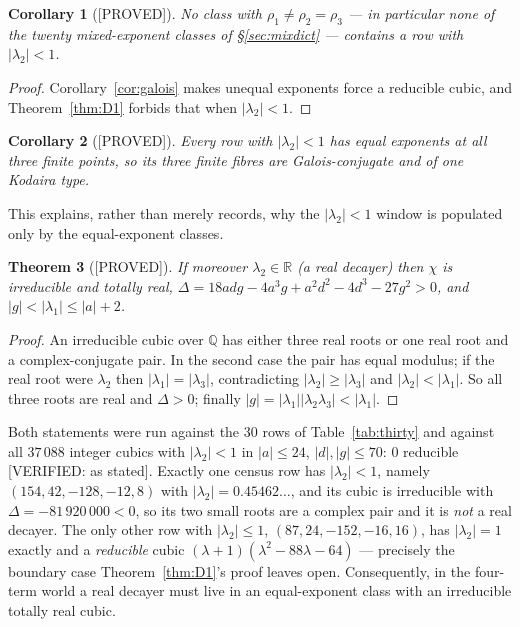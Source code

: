 \documentclass[11pt,reqno]{amsart}
\theoremstyle{plain}
\newtheorem{theorem}{Theorem}[section]
\newtheorem{corollary}[theorem]{Corollary}
\theoremstyle{definition}
\theoremstyle{remark}
\theoremstyle{plain}
\newcommand{\Q}{\mathbb{Q}}
\newcommand{\R}{\mathbb{R}}
\newcommand{\Proved}{\textup{\textsf{[PROVED]}}}
\newcommand{\Verified}[1]{\textup{\textsf{[VERIFIED: #1]}}}
\begin{document}
\begin{corollary}[\Proved]\label{cor:D11}
No class with $\rho_1\ne\rho_2=\rho_3$ --- in particular none of the twenty
mixed-exponent classes of \S\ref{sec:mixdict} --- contains a row with
$|\lambda_2|<1$.
\end{corollary}

\begin{proof}
Corollary~\ref{cor:galois} makes unequal exponents force a reducible cubic, and
Theorem~\ref{thm:D1} forbids that when $|\lambda_2|<1$.
\end{proof}

\begin{corollary}[\Proved]\label{cor:D12}
Every row with $|\lambda_2|<1$ has equal exponents at all three finite points, so
its three finite fibres are Galois-conjugate and of one Kodaira type.
\end{corollary}

This explains, rather than merely records, why the $|\lambda_2|<1$ window is
populated only by the equal-exponent classes.

\begin{theorem}[\Proved]\label{thm:D2}
If moreover $\lambda_2\in\R$ \textup{(}a \emph{real decayer}\textup{)} then
$\chi$ is irreducible and \emph{totally real},
$\Delta=18adg-4a^3g+a^2d^2-4d^3-27g^2>0$, and $|g|<|\lambda_1|\le|a|+2$.
\end{theorem}

\begin{proof}
An irreducible cubic over $\Q$ has either three real roots or one real root and a
complex-conjugate pair. In the second case the pair has equal modulus; if the
real root were $\lambda_2$ then $|\lambda_1|=|\lambda_3|$, contradicting
$|\lambda_2|\ge|\lambda_3|$ and $|\lambda_2|<|\lambda_1|$. So all three roots are
real and $\Delta>0$; finally $|g|=|\lambda_1||\lambda_2\lambda_3|<|\lambda_1|$.
\end{proof}

Both statements were run against the $30$ rows of Table~\ref{tab:thirty} and
against all $37\,088$ integer cubics with $|\lambda_2|<1$ in $|a|\le24$,
$|d|,|g|\le70$: $0$ reducible \Verified{as stated}. Exactly one census row has
$|\lambda_2|<1$, namely $(154,42,-128,-12,8)$ with
$|\lambda_2|=0.45462\ldots$, and its cubic is irreducible with
$\Delta=-81\,920\,000<0$, so its two small roots are a complex pair and it is
\emph{not} a real decayer. The only other row with $|\lambda_2|\le1$,
$(87,24,-152,-16,16)$, has $|\lambda_2|=1$ exactly and a \emph{reducible} cubic
$(\lambda+1)(\lambda^2-88\lambda-64)$ --- precisely the boundary case
Theorem~\ref{thm:D1}'s proof leaves open. Consequently, in the four-term world a
real decayer must live in an equal-exponent class with an irreducible totally
real cubic.
\end{document}
